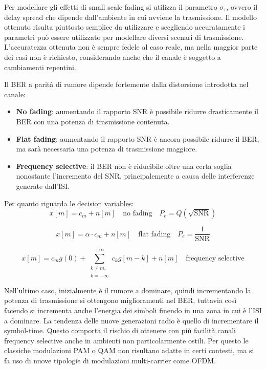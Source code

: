Per modellare gli effetti di small scale fading si utilizza il parametro $\sigma_\tau$, ovvero il delay spread che dipende dall'ambiente in cui avviene la trasmissione. Il modello ottenuto risulta piuttosto semplice da utilizzare e secgliendo accuratamente i parametri può essere utilizzato per modellare diversi scenari di trasmissione. L'accuratezza ottenuta non è sempre fedele al caso reale, ma nella maggior parte dei casi non è richiesto, considerando anche che il canale è soggetto a cambiamenti repentini.

Il BER a parità di rumore dipende fortemente dalla distorsione introdotta nel canale:
\begin{itemize}
    \item \textbf{No fading}: aumentando il rapporto SNR è possibile ridurre drasticamente il BER con una potenza di trasmissione contenuta.
    \item \textbf{Flat fading}: aumentando il rapporto SNR è ancora possibile ridurre il BER, ma sarà necessaria una potenza di trasmissione maggiore.
    \item \textbf{Frequency selective}: il BER non è riducibile oltre una certa soglia nonostante l'incremento del SNR, principalemente a causa delle interferenze generate dall'ISI.
\end{itemize}

Per quanto riguarda le decision variables:
\[
    x\left[m\right] = c_m + n\left[m\right] \quad \text{no fading} \quad P_e = Q(\sqrt{\text{SNR}})
\]

\[
    x\left[m\right] = \alpha \cdot c_m + n\left[m\right] \quad \text{flat fading} \quad P_e = \frac{1}{\text{SNR}}
\]

\[
    x\left[m\right] = c_m g(0) + \sum_{\substack{k \neq m,\\ k=-\infty}}^{+\infty} c_{k} g\left[m-k\right] + n\left[m\right] \quad \text{frequency selective}
\]

Nell'ultimo caso, inizialmente è il rumore a dominare, quindi incrementando la potenza di trasmissione si ottengono miglioramenti nel BER, tuttavia così facendo si incrementa anche l'energia dei simboli finendo in una zona in cui è l'ISI a dominare.
La tendenza delle nuove generazioni radio è quello di incrementare il symbol-time. Questo comporta il rischio di ottenere con più facilità canali frequency selective anche in ambienti non particolarmente ostili. Per questo le classiche modulazioni PAM o QAM non risultano adatte in certi contesti, ma si fa uso di nuove tipologie di modulazioni multi-carrier come OFDM.


